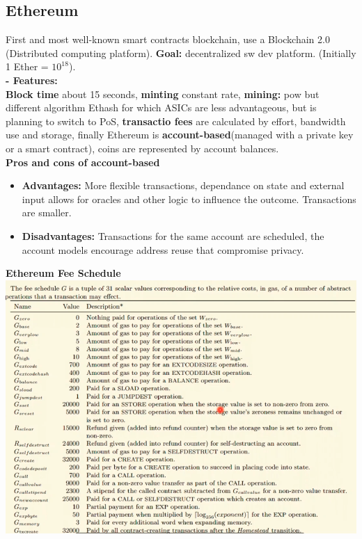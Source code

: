 \documentclass{article}
\begin{document}
\subsection{Ethereum}
First and most well-known smart contracts blockchain, use a Blockchain 2.0 (Distributed computing platform). \textbf{Goal: }decentralized sw dev platform. (Initially 1 Ether = $10^18$).\\
\textbf{- Features: }\\
\textbf{Block time} about 15 seconds, \textbf{minting} constant rate, \textbf{mining: } pow but different algorithm Ethash for which ASICs are less advantageous, but is planning to switch to PoS, \textbf{transactio fees} are calculated by effort, bandwidth use and storage, finally Ethereum is \textbf{account-based}(managed with a private key or a smart contract), coins are represented by account balances.\\
\textbf{Pros and cons of account-based}\\
\begin{itemize}
    \item \textbf{Advantages:} More flexible transactions, dependance on state and external input allows for oracles and other logic to influence the outcome. Transactions are smaller. 
    \item \textbf{Disadvantages:} Transactions for the same account are scheduled, the account models encourage address reuse that compromise privacy.
\end{itemize}
\textbf{Ethereum Fee Schedule}\\
\includegraphics[scale=0.5]{52.png}\\\\
\end{document}
